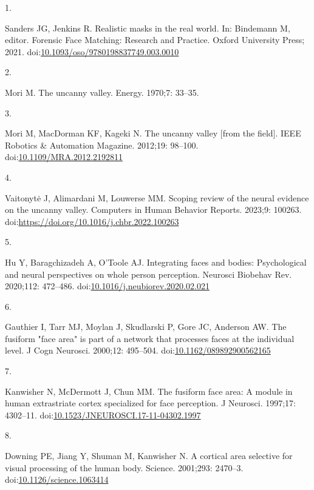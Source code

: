 \documentclass[
]{article}
\newlength{\cslhangindent}
\newlength{\csllabelwidth}
\newenvironment{CSLReferences}[2] %
 {\begin{list}{}{%
  \setlength{\itemindent}{0pt}
  \setlength{\leftmargin}{0pt}
  \setlength{\parsep}{0pt}
  \ifodd #1
   \setlength{\leftmargin}{\cslhangindent}
   \setlength{\itemindent}{-1\cslhangindent}
  \fi
  \setlength{\itemsep}{#2\baselineskip}}}
 {\end{list}}
\newcommand{\CSLLeftMargin}[1]{\parbox[t]{\csllabelwidth}{\strut#1\strut}}
\newcommand{\CSLRightInline}[1]{\parbox[t]{\linewidth - \csllabelwidth}{\strut#1\strut}}
\begin{document}
\label{refs}
\begin{CSLReferences}{0}{1}
\CSLLeftMargin{1. }%
\CSLRightInline{Sanders JG, Jenkins R. Realistic masks in the real world. In: Bindemann M, editor. {Forensic Face Matching: Research and Practice}. Oxford University Press; 2021. doi:\href{https://doi.org/10.1093/oso/9780198837749.003.0010}{10.1093/oso/9780198837749.003.0010}}

\CSLLeftMargin{2. }%
\CSLRightInline{Mori M. The uncanny valley. Energy. 1970;7: 33--35. }

\CSLLeftMargin{3. }%
\CSLRightInline{Mori M, MacDorman KF, Kageki N. The uncanny valley {[}from the field{]}. IEEE Robotics \& Automation Magazine. 2012;19: 98--100. doi:\href{https://doi.org/10.1109/MRA.2012.2192811}{10.1109/MRA.2012.2192811}}

\CSLLeftMargin{4. }%
\CSLRightInline{Vaitonytė J, Alimardani M, Louwerse MM. Scoping review of the neural evidence on the uncanny valley. Computers in Human Behavior Reports. 2023;9: 100263. doi:\url{https://doi.org/10.1016/j.chbr.2022.100263}}

\CSLLeftMargin{5. }%
\CSLRightInline{Hu Y, Baragchizadeh A, O'Toole AJ. Integrating faces and bodies: Psychological and neural perspectives on whole person perception. Neurosci Biobehav Rev. 2020;112: 472--486. doi:\href{https://doi.org/10.1016/j.neubiorev.2020.02.021}{10.1016/j.neubiorev.2020.02.021}}

\CSLLeftMargin{6. }%
\CSLRightInline{Gauthier I, Tarr MJ, Moylan J, Skudlarski P, Gore JC, Anderson AW. The fusiform "face area" is part of a network that processes faces at the individual level. J Cogn Neurosci. 2000;12: 495--504. doi:\href{https://doi.org/10.1162/089892900562165}{10.1162/089892900562165}}

\CSLLeftMargin{7. }%
\CSLRightInline{Kanwisher N, McDermott J, Chun MM. The fusiform face area: A module in human extrastriate cortex specialized for face perception. J Neurosci. 1997;17: 4302--11. doi:\href{https://doi.org/10.1523/JNEUROSCI.17-11-04302.1997}{10.1523/JNEUROSCI.17-11-04302.1997}}

\CSLLeftMargin{8. }%
\CSLRightInline{Downing PE, Jiang Y, Shuman M, Kanwisher N. A cortical area selective for visual processing of the human body. Science. 2001;293: 2470--3. doi:\href{https://doi.org/10.1126/science.1063414}{10.1126/science.1063414}}


\end{CSLReferences}
\end{document}
